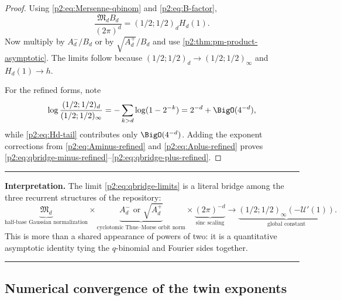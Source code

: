 \documentclass[11pt,oneside]{article}
\theoremstyle{definition}
\theoremstyle{remark}
\newenvironment{boxedremark}{\par\smallskip\noindent\begin{center}\begin{minipage}{0.94\textwidth}\hrule\vspace{0.6em}\small}{\vspace{0.6em}\hrule\end{minipage}\end{center}\smallskip}
\begin{document}
\begin{proof}
Using \eqref{p2:eq:Mersenne-qbinom} and \eqref{p2:eq:B-factor},
\[
 \frac{\mathfrak M_dB_d}{(2\pi)^d}
 =(1/2;1/2)_dH_d(1).
\]
Now multiply by $A_d^-/B_d$ or by $\sqrt{A_d^+}/B_d$ and use
\cref{p2:thm:pm-product-asymptotic}. The limits follow because
$(1/2;1/2)_d\to(1/2;1/2)_\infty$ and $H_d(1)\to h$.

For the refined forms, note
\[
 \log\frac{(1/2;1/2)_d}{(1/2;1/2)_\infty}
 =-\sum_{k>d}\log(1-2^{-k})=2^{-d}+\BigO(4^{-d}),
\]
while \eqref{p2:eq:Hd-tail} contributes only $\BigO(4^{-d})$. Adding the exponent
corrections from \eqref{p2:eq:Aminus-refined} and \eqref{p2:eq:Aplus-refined} proves
\eqref{p2:eq:qbridge-minus-refined}--\eqref{p2:eq:qbridge-plus-refined}.
\end{proof}

\begin{boxedremark}
\textbf{Interpretation.} The limit \eqref{p2:eq:qbridge-limits} is a literal bridge
among the three recurrent structures of the repository:
\[
 \underbrace{\mathfrak M_d}_{\text{half-base Gaussian normalization}}
 \times
 \underbrace{A_d^-\text{ or }\sqrt{A_d^+}}_{\text{cyclotomic Thue--Morse orbit norm}}
 \times
 \underbrace{(2\pi)^{-d}}_{\text{sinc scaling}}
 \longrightarrow
 \underbrace{(1/2;1/2)_\infty(-\mathscr U'(1))}_{\text{global constant}}.
\]
This is more than a shared appearance of powers of two: it is a quantitative
asymptotic identity tying the $q$-binomial and Fourier sides together.
\end{boxedremark}

\subsection{Numerical convergence of the twin exponents}
\end{document}
